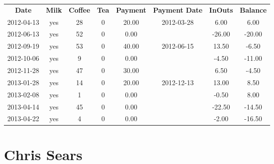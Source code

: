 \begin{center}
\begin{tabular}{cccccccc}
\textbf{Date} & \textbf{Milk} & \textbf{Coffee} & \textbf{Tea} & \textbf{Payment} & \textbf{Payment Date} & \textbf{InOuts} & \textbf{Balance} \\
2012-04-13 & yes & 28 & 0 & 20.00 & 2012-03-28 &   6.00 &   6.00\\ 
2012-06-13 & yes & 52 & 0 &  0.00 &  & -26.00 & -20.00\\ 
2012-09-19 & yes & 53 & 0 & 40.00 & 2012-06-15 &  13.50 &  -6.50\\ 
2012-10-06 & yes &  9 & 0 &  0.00 &  &  -4.50 & -11.00\\ 
2012-11-28 & yes & 47 & 0 & 30.00 &  &   6.50 &  -4.50\\ 
2013-01-28 & yes & 14 & 0 & 20.00 & 2012-12-13 &  13.00 &   8.50\\ 
2013-02-08 & yes &  1 & 0 &  0.00 &  &  -0.50 &   8.00\\ 
2013-04-14 & yes & 45 & 0 &  0.00 &  & -22.50 & -14.50\\ 
2013-04-22 & yes &  4 & 0 &  0.00 &  &  -2.00 & -16.50
\end{tabular}
\end{center}

\section{Chris Sears}

